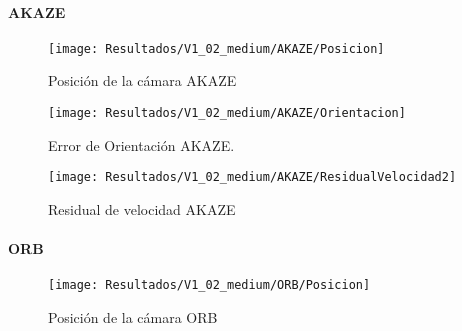 \paragraph {AKAZE}


\begin{figure}[H]
	\centering
	\texttt{[image: Resultados/V1\_02\_medium/AKAZE/Posicion]}
	\caption{Posición de la cámara AKAZE}
	\label{imagen:Resultados/V1_02_medium/AKAZE/Posicion}
\end{figure}


\begin{figure}[H]
	\centering
	\texttt{[image: Resultados/V1\_02\_medium/AKAZE/Orientacion]}
	\caption[Error de Orientación AKAZE]{Error de Orientación AKAZE.}
	\label{imagen:Resultados/V1_02_medium/AKAZE/Orientacion}
\end{figure}



\begin{figure}[H]
	\centering
	\texttt{[image: Resultados/V1\_02\_medium/AKAZE/ResidualVelocidad2]}
	\caption{Residual de velocidad AKAZE}
	\label{imagen:Resultados/V1_02_medium/AKAZE/ResidualVelocidad}
\end{figure}

\paragraph {ORB}


\begin{figure}[H]
	\centering
	\texttt{[image: Resultados/V1\_02\_medium/ORB/Posicion]}
	\caption{Posición de la cámara ORB}
	\label{imagen:Resultados/V1_02_medium/ORB/Posicion}
\end{figure}



